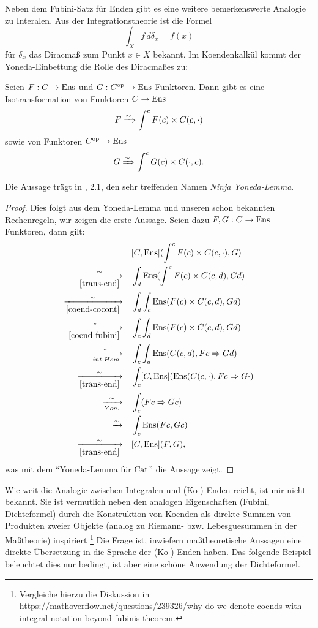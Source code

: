 Neben dem Fubini-Satz für Enden gibt es eine weitere bemerkenswerte
Analogie zu Interalen. Aus der Integrationstheorie ist die Formel
\[ \int_X f \, d\delta_x = f(x) \]
für $\delta_x$ das Diracmaß zum Punkt $x \in X$ bekannt. Im
Koendenkalkül kommt der Yoneda-Einbettung die Rolle des Diracmaßes zu:
\begin{prop} \label{coend-density}
  Seien $F: C \to \operatorname{Ens}$ und $G: C^\mathrm{op} \to \operatorname{Ens}$ Funktoren. Dann gibt es
  eine Isotransformation von Funktoren $C \to \operatorname{Ens}$
  \[ F \xRightarrow{\sim} \int^c F(c) \times C(c, \cdot) \]
  sowie von Funktoren $C^\mathrm{op} \to \operatorname{Ens}$
  \[ G \xRightarrow{\sim} \int^c G(c) \times C(\cdot, c). \]
\end{prop}
\begin{bem}
  Die Aussage trägt in \cite{Lore}, 2.1, den sehr treffenden Namen
  \emph{Ninja Yoneda-Lemma}.
\end{bem}
\begin{proof}
  Dies folgt aus dem Yoneda-Lemma und unseren schon bekannten
  Rechenregeln, wir zeigen die erste Aussage. Seien dazu $F, G: C \to
  \operatorname{Ens}$ Funktoren, dann gilt:
  \begin{align*}
    &[C, \operatorname{Ens}](\int^c F(c) \times C(c, \cdot), G) \\
    \xrightarrow[\ref{trans-end}]{\sim} \quad
    &\int_d \operatorname{Ens}(\int^c F(c) \times C(c, d), Gd) \\
    \xrightarrow[\ref{coend-cocont}]{\sim} \quad
    &\int_d \int_c \operatorname{Ens}(F(c) \times C(c, d), Gd) \\
    \xrightarrow[\ref{coend-fubini}]{\sim} \quad
    &\int_c \int_d \operatorname{Ens}(F(c) \times C(c, d), Gd) \\
    \xrightarrow[int. Hom]{\sim} \quad
    &\int_c \int_d \operatorname{Ens}(C(c, d), Fc \Rightarrow Gd) \\
    \xrightarrow[\ref{trans-end}]{\sim} \quad
    &\int_c [C, \operatorname{Ens}](\operatorname{Ens}(C(c, \cdot), Fc \Rightarrow G \cdot) \\
    \xrightarrow[Yon.]{\sim} \quad
    &\int_c (Fc \Rightarrow Gc) \\
    \xrightarrow[]{\sim} \quad &\int_c \operatorname{Ens}(Fc, Gc) \\
    \xrightarrow[\ref{trans-end}]{\sim} \quad
    &[C, \operatorname{Ens}](F, G),
  \end{align*}
  was mit dem ``Yoneda-Lemma für $\operatorname{Cat}$'' die Aussage zeigt.
\end{proof}
\begin{bem}
  Wie weit die Analogie zwischen Integralen und (Ko-) Enden reicht,
  ist mir nicht bekannt. Sie ist vermutlich neben den analogen
  Eigenschaften (Fubini, Dichteformel) durch die Konstruktion von
  Koenden als direkte Summen von Produkten zweier Objekte (analog zu
  Riemann- bzw. Lebesguesummen in der Maßtheorie)
  inspiriert
  \footnote{Vergleiche hierzu die Diskussion in
    \url{https://mathoverflow.net/questions/239326/why-do-we-denote-coends-with-integral-notation-beyond-fubinis-theorem}.}
  Die Frage ist, inwiefern maßtheoretische Aussagen eine direkte
  Übersetzung in die Sprache der (Ko-) Enden haben. Das folgende
  Beispiel beleuchtet dies nur bedingt, ist aber eine schöne Anwendung
  der Dichteformel.
\end{bem}
